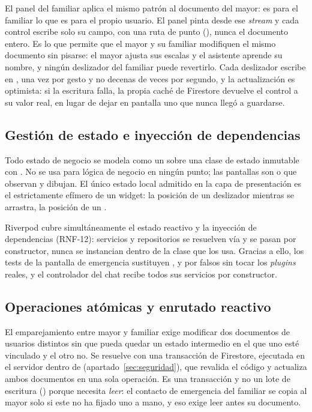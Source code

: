 El panel del familiar aplica el mismo patrón al documento del mayor:  es para el familiar lo que  es para el propio usuario. El panel pinta desde ese \emph{stream} y cada control escribe solo su campo, con una ruta de punto (), nunca el documento entero. Es lo que permite que el mayor y su familiar modifiquen el mismo documento sin pisarse: el mayor ajusta sus escalas y el asistente aprende su nombre, y ningún deslizador del familiar puede revertirlo. Cada deslizador escribe en , una vez por gesto y no decenas de veces por segundo, y la actualización es optimista: si la escritura falla, la propia caché de Firestore devuelve el control a su valor real, en lugar de dejar en pantalla uno que nunca llegó a guardarse.

\subsection{Gestión de estado e inyección de dependencias}
\label{sec:estado-di}

Todo estado de negocio se modela como un  sobre una clase de estado inmutable con . No se usa  para lógica de negocio en ningún punto; las pantallas son  o  que observan y dibujan. El único estado local admitido en la capa de presentación es el estrictamente efímero de un widget: la posición de un deslizador mientras se arrastra, la posición de un .

Riverpod cubre simultáneamente el estado reactivo y la inyección de dependencias (RNF-12): servicios y repositorios se resuelven vía  y se pasan por constructor, nunca se instancian dentro de la clase que los usa. Gracias a ello, los tests de la pantalla de emergencia sustituyen ,  y  por falsos sin tocar los \emph{plugins} reales, y el controlador del chat recibe todos sus servicios por constructor.

\subsection{Operaciones atómicas y enrutado reactivo}

El emparejamiento entre mayor y familiar exige modificar dos documentos de usuarios distintos sin que pueda quedar un estado intermedio en el que uno esté vinculado y el otro no. Se resuelve con una transacción de Firestore, ejecutada en el servidor dentro de  (apartado~\ref{sec:seguridad}), que revalida el código y actualiza ambos documentos en una sola operación. Es una transacción y no un lote de escritura () porque necesita \emph{leer}: el contacto de emergencia del familiar se copia al mayor solo si este no ha fijado uno a mano, y eso exige leer antes su documento.

